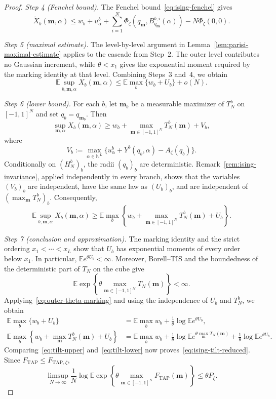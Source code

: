 \documentclass[a4paper,10pt,reqno]{amsart}
\numberwithin{equation}{section}
\newcommand{\dN}{\mathbb{N}}%
\newcommand{\dE}{\mathbb{E}}%
\newcommand{\TAP}{\mathrm{TAP}}
\newcommand{\bfm}{\mathbf{m}}
\begin{document}
\begin{proof}
		\medskip\noindent\emph{Step 4 (Fenchel bound).}\;
		The Fenchel bound~\eqref{eq:ising-fenchel} gives
		\[
		\widetilde X_b(\bfm,\alpha)
		\le
		w_b+u_\alpha^b
		+\sum_{i=1}^N
		\Phi_\zeta(q_\bfm,B_{q_\bfm}^{b,i}(\alpha))
		-N\Phi_\zeta(0,0).
		\]
		
		\medskip\noindent\emph{Step 5 (maximal estimate).}\;
		The level-by-level argument in
		Lemma~\ref{lem:parisi-maximal-estimate} applies to the cascade
		from Step~2. The outer level contributes no Gaussian increment,
		while $\theta<x_1$ gives the exponential moment required by the
		marking identity at that level. Combining Steps~3 and~4, we obtain
		\begin{equation}\label{eq:tilt-upper}
			\dE\sup_{b,\bfm,\alpha}X_b(\bfm,\alpha)
			\le
			\dE\max_b\{w_b+U_b\}+o(N).
		\end{equation}
		
		\medskip\noindent\emph{Step 6 (lower bound).}\;
		For each $b$, let $\bfm_b$ be a measurable maximizer of $T_N^b$
		on $[-1,1]^N$ and set $q_b=q_{\bfm_b}$. Then
		\[
		\sup_{\bfm,\alpha}X_b(\bfm,\alpha)
		\ge
		w_b+\max_{\bfm\in[-1,1]^N}T_N^b(\bfm)
		+V_b,
		\]
		where
		\[
		V_b
		:=
		\max_{\alpha\in\dN^L}
		\{u_\alpha^b+Y^b(q_b,\alpha)-A_\zeta(q_b)\}.
		\]
		Conditionally on $(H_N^b)_b$, the radii $(q_b)_b$ are
		deterministic. Remark~\ref{rem:ising-invariance}, applied
		independently in every branch, shows that the variables $(V_b)_b$
		are independent, have the same law as $(U_b)_b$, and are
		independent of $(\max_\bfm T_N^b)_b$. Consequently,
		\begin{equation}\label{eq:tilt-lower}
			\dE\sup_{b,\bfm,\alpha}X_b(\bfm,\alpha)
			\ge
			\dE\max_b
			\left\{
			w_b+\max_{\bfm\in[-1,1]^N}T_N^b(\bfm)+U_b
			\right\}.
		\end{equation}
		
		\medskip\noindent\emph{Step 7 (conclusion and approximation).}\;
		The marking identity and the strict ordering
		$x_1<\cdots<x_L$ show that $U_b$ has exponential moments of every
		order below $x_1$. In particular, $\dE e^{\theta U_b}<\infty$.
		Moreover, Borell--TIS and the boundedness of the deterministic part
		of $T_N$ on the cube give
		\[
		\dE\exp\left\{
		\theta\max_{\bfm\in[-1,1]^N}T_N(\bfm)
		\right\}<\infty.
		\]
		Applying~\eqref{eq:outer-theta-marking} and using the independence
		of $U_b$ and $T_N^b$, we obtain
		\[
		\begin{aligned}
			\dE\max_b\{w_b+U_b\}
			&=
			\dE\max_b w_b
			+\frac1\theta\log\dE e^{\theta U_b},\\
			\dE\max_b
			\left\{
			w_b+\max_\bfm T_N^b(\bfm)+U_b
			\right\}
			&=
			\dE\max_b w_b
			+\frac1\theta
			\log\dE e^{\theta\max_\bfm T_N(\bfm)}
			+\frac1\theta\log\dE e^{\theta U_b}.
		\end{aligned}
		\]
		Comparing~\eqref{eq:tilt-upper} and~\eqref{eq:tilt-lower} now
		proves~\eqref{eq:ising-tilt-reduced}. Since
		$F_{\TAP}\le F_{\TAP,\zeta}$,
		\[
		\limsup_{N\to\infty}
		\frac1N
		\log\dE\exp\left\{
		\theta\max_{\bfm\in[-1,1]^N}F_{\TAP}(\bfm)
		\right\}
		\le\theta P_\zeta.
		\]
		

\end{proof}
\end{document}
